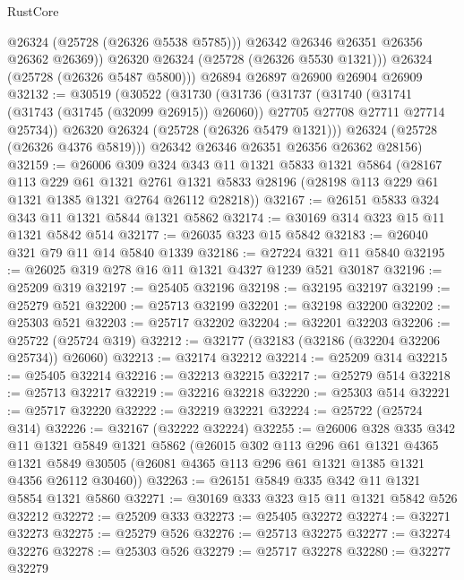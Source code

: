 \begin{lexlean}{RustCore}
\begin{coremodule}
              @26324
              (@25728 (@26326 @5538 @5785)))
            @26342
            @26346
            @26351
            @26356
            @26362
            @26369))
        @26320
        @26324
        (@25728 (@26326 @5530 @1321)))
      @26324
      (@25728 (@26326 @5487 @5800)))
    @26894
    @26897
    @26900
    @26904
    @26909
@32132 := @30519
    (@30522
      (@31730
        (@31736
          (@31737
            (@31740
              (@31741 (@31743 (@31745 (@32099 @26915)) @26060))
              @27705
              @27708
              @27711
              @27714
              @25734))
          @26320
          @26324
          (@25728 (@26326 @5479 @1321)))
        @26324
        (@25728 (@26326 @4376 @5819)))
      @26342
      @26346
      @26351
      @26356
      @26362
      @28156)
@32159 := @26006
    @309
    @324
    @343
    @11
    @1321
    @5833
    @1321
    @5864
    (@28167
      @113
      @229
      @61
      @1321
      @2761
      @1321
      @5833
      @28196
      (@28198 @113 @229 @61 @1321 @1385 @1321 @2764 @26112 @28218))
@32167 := @26151 @5833 @324 @343 @11 @1321 @5844 @1321 @5862
@32174 := @30169 @314 @323 @15 @11 @1321 @5842 @514
@32177 := @26035 @323 @15 @5842
@32183 := @26040 @321 @79 @11 @14 @5840 @1339
@32186 := @27224 @321 @11 @5840
@32195 := @26025 @319 @278 @16 @11 @1321 @4327 @1239 @521 @30187
@32196 := @25209 @319
@32197 := @25405 @32196
@32198 := @32195 @32197
@32199 := @25279 @521
@32200 := @25713 @32199
@32201 := @32198 @32200
@32202 := @25303 @521
@32203 := @25717 @32202
@32204 := @32201 @32203
@32206 := @25722 (@25724 @319)
@32212 := @32177 (@32183 (@32186 (@32204 @32206 @25734)) @26060)
@32213 := @32174 @32212
@32214 := @25209 @314
@32215 := @25405 @32214
@32216 := @32213 @32215
@32217 := @25279 @514
@32218 := @25713 @32217
@32219 := @32216 @32218
@32220 := @25303 @514
@32221 := @25717 @32220
@32222 := @32219 @32221
@32224 := @25722 (@25724 @314)
@32226 := @32167 (@32222 @32224)
@32255 := @26006
    @328
    @335
    @342
    @11
    @1321
    @5849
    @1321
    @5862
    (@26015
      @302
      @113
      @296
      @61
      @1321
      @4365
      @1321
      @5849
      @30505
      (@26081 @4365 @113 @296 @61 @1321 @1385 @1321 @4356 @26112 @30460))
@32263 := @26151 @5849 @335 @342 @11 @1321 @5854 @1321 @5860
@32271 := @30169 @333 @323 @15 @11 @1321 @5842 @526 @32212
@32272 := @25209 @333
@32273 := @25405 @32272
@32274 := @32271 @32273
@32275 := @25279 @526
@32276 := @25713 @32275
@32277 := @32274 @32276
@32278 := @25303 @526
@32279 := @25717 @32278
@32280 := @32277 @32279

\end{coremodule}
\end{lexlean}
